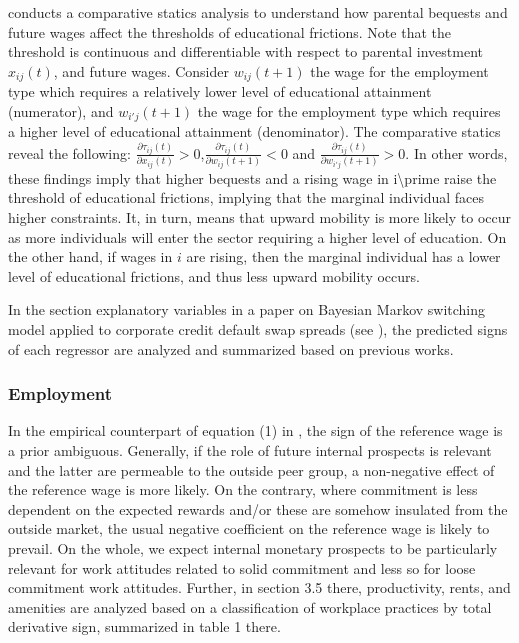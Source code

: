 \documentclass[11pt]{book}
\begin{document}
\cite{hennig2021labor} conducts a comparative statics analysis to
understand how parental bequests and future wages affect the thresholds
of educational frictions. Note that the threshold is continuous and
differentiable with respect to parental investment $x_{ij}\left(t\right)$,
and future wages. Consider $w_{ij}\left(t+1\right)$ the wage for
the employment type which requires a relatively lower level of educational
attainment (numerator), and $w_{i'j}\left(t+1\right)$ the wage for
the employment type which requires a higher level of educational attainment
(denominator). The comparative statics reveal the following: $\frac{\partial\tau_{ij}\left(t\right)}{\partial x_{ij}\left(t\right)}>0$,$\frac{\partial\tau_{ij}\left(t\right)}{\partial w_{ij}\left(t+1\right)}<0$
and $\frac{\partial\tau_{ij}\left(t\right)}{\partial w_{i'j}\left(t+1\right)}>0$.
In other words, these findings imply that higher bequests and a rising
wage in i\textbackslash prime raise the threshold of educational
frictions, implying that the marginal individual faces higher constraints.
It, in turn, means that upward mobility is more likely to occur as
more individuals will enter the sector requiring a higher level of
education. On the other hand, if wages in $i$ are rising, then the
marginal individual has a lower level of educational frictions, and
thus less upward mobility occurs.

In the section \textquotedbl explanatory variables\textquotedbl{} in a paper on Bayesian Markov switching model applied to corporate credit default swap spreads (see \cite{bulfone2021corporate}), the predicted signs of each regressor
are analyzed and summarized based on previous works.


\subsubsection{Employment}

In the empirical counterpart of equation (1) in \cite{cristini2007high},
the sign of the reference wage is a prior ambiguous. Generally, if
the role of future internal prospects is relevant and the latter are
permeable to the outside peer group, a non-negative effect of the
reference wage is more likely. On the contrary, where commitment is
less dependent on the expected rewards and/or these are somehow insulated
from the outside market, the usual negative coefficient on the reference
wage is likely to prevail. On the whole, we expect internal monetary
prospects to be particularly relevant for work attitudes related to
solid commitment and less so for loose commitment work attitudes.
Further, in section 3.5 there, productivity, rents, and amenities
are analyzed based on a classification of workplace practices by total
derivative sign, summarized in table 1 there.
\end{document}
